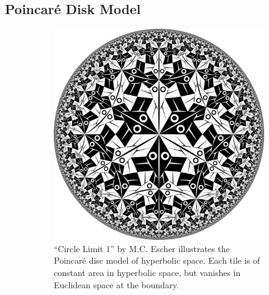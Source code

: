 \documentclass[sigconf, review]{acmart}
\begin{document}
\subsection{Poincar\'e Disk Model}
 \begin{figure}[tb]
 \centering

 \begin{subfigure}[t]{0.4\hsize}
        \centering
        \includegraphics[width=\hsize]{circle_limit1}
        \caption{``Circle Limit 1'' by M.C. Escher illustrates the Poincar\'e disc model of hyperbolic space. Each tile is of constant area in hyperbolic space, but vanishes in Euclidean space at the boundary.}
        \label{fig:circle_limit1}
    \end{subfigure}%
   \hspace{10mm}
   \begin{subfigure}[t]{0.4\hsize}
        \centering

\end{subfigure}
\end{figure}
\end{document}
